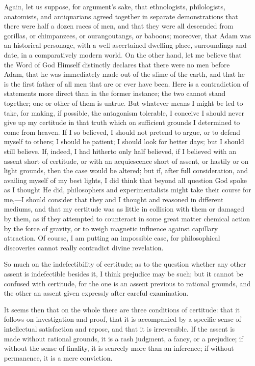 Again, let us suppose, for argument's sake, that ethnologists,
philologists, anatomists, and antiquarians agreed together in separate
demonstrations that there were half a dozen races of men, and that
they were all descended from gorillas, or chimpanzees, or
ourangoutangs, or baboons; moreover, that Adam was an historical
personage, with a well-ascertained dwelling-place, surroundings and
date, in a comparatively modern world. On the other hand, let me
believe that the Word of God Himself distinctly declares that there
were no men before Adam, that he was immediately made out of the slime
of the earth, and that he is the first father of all men that are or
ever have been. Here is a contradiction of statements more direct than
in the former instance; the two cannot stand together; one or other of
them is untrue. But whatever means I might be led to take, for making,
if possible, the antagonism tolerable, I conceive I should never give
up my certitude in that truth which on sufficient grounds I determined
to come from heaven. If I so believed, I should not pretend to argue,
or to defend myself to others; I should be patient; I should look for
better days; but I should still believe. If, indeed, I had hitherto
only half believed, if I believed with an assent short of certitude,
or with an acquiescence short of assent, or hastily or on light
grounds, then the case would be altered; but if, after full
consideration, and availing myself of my best lights, I did think that
beyond all question God spoke as I thought He did, philosophers
and experimentalists might take their course for me,—I should
consider that they and I thought and reasoned in different mediums,
and that my certitude was as little in collision with them or damaged
by them, as if they attempted to counteract in some great matter
chemical action by the force of gravity, or to weigh magnetic
influence against capillary attraction. Of course, I am putting an
impossible case, for philosophical discoveries cannot really
contradict divine revelation.

So much on the indefectibility of certitude; as to the question
whether any other assent is indefectible besides it, I think prejudice
may be such; but it cannot be confused with certitude, for the one is
an assent previous to rational grounds, and the other an assent given
expressly after careful examination.

It seems then that on the whole there are three conditions of
certitude: that it follows on investigation and proof, that it is
accompanied by a specific sense of intellectual satisfaction and
repose, and that it is irreversible. If the assent is made without
rational grounds, it is a rash judgment, a fancy, or a prejudice; if
without the sense of finality, it is scarcely more than an inference;
if without permanence, it is a mere conviction.

